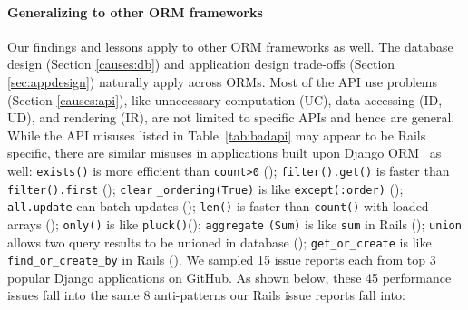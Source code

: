 \paragraph{\bf{Generalizing to other ORM frameworks}}
Our findings and lessons apply to other ORM frameworks as well. The database design (Section \ref{causes:db}) and application design trade-offs (Section \ref{sec:appdesign}) naturally apply across ORMs. Most of the API use problems (Section \ref{causes:api}), like unnecessary computation (UC), data accessing (ID, UD), and rendering (IR), are not limited to specific APIs and hence are general.
While the API misuses listed in Table~\ref{tab:badapi}
may appear to be Rails specific, 
there are similar misuses in applications built upon Django ORM~\cite{django} as well: {\tt exists()} is more efficient than 
\texttt{count>0} ({\footnotesize {}}); {\tt filter().get()} is faster than 
\texttt{filter().first} ({\footnotesize {}}); {\tt clear}
\texttt{\_ordering(True)} is like 
\texttt{except(:order)} ({\footnotesize {}}); {\tt all.update} can batch updates ({\footnotesize {}}); 
{\tt len()} is faster than {\tt count()} with loaded arrays ({\footnotesize {}});  
 {\tt only()} is like {\tt pluck()}({\footnotesize {}}); 
  {\tt aggregate}
  {\tt (Sum)} is like {\tt sum} in Rails  ({\footnotesize {}}); 
   {\tt union} allows two query results to be unioned in database ({\footnotesize {}}); 
{\tt get\_or\_create} is like 
{\tt find\_or\_create\_by} in Rails 
({\footnotesize {}}). 
We sampled 15 issue reports each from top 3 popular Django applications on GitHub. As shown below, these 45 performance issues fall into the same 8 anti-patterns our \numissues Rails issue reports fall into: 

